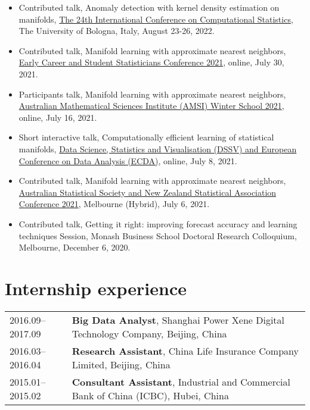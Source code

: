 \documentclass[10pt,a4paper,]{article}
\begin{document}
\begin{itemize}
\item
  Contributed talk, Anomaly detection with kernel density estimation on
  manifolds,
  \href{http://www.compstat2022.org/index.php}{The 24th International Conference on Computational Statistics},
  The University of Bologna, Italy, August 23-26, 2022.
\item
  Contributed talk, Manifold learning with approximate nearest
  neighbors,
  \href{http://ecssc2021.com.au/}{Early Career and Student Statisticians Conference 2021},
  online, July 30, 2021.
\item
  Participants talk, Manifold learning with approximate nearest
  neighbors,
  \href{https://ws.amsi.org.au/}{Australian Mathematical Sciences Institute (AMSI) Winter School 2021},
  online, July 16, 2021.
\item
  Short interactive talk, Computationally efficient learning of
  statistical manifolds,
  \href{https://iasc-isi.org/dssv-ecda2021/}{Data Science, Statistics and Visualisation (DSSV) and European Conference on Data Analysis (ECDA)},
  online, July 8, 2021.
\item
  Contributed talk, Manifold learning with approximate nearest
  neighbors,
  \href{https://anzsc2021.com.au/}{Australian Statistical Society and New Zealand Statistical Association Conference 2021},
  Melbourne (Hybrid), July 6, 2021.
\item
  Contributed talk, Getting it right: improving forecast accuracy and
  learning techniques Session, Monash Business School Doctoral Research
  Colloquium, Melbourne, December 6, 2020.
\end{itemize}

\hypertarget{internship-experience}{%
\section{Internship experience}\label{internship-experience}}

\begin{tabular}{ll}
  2016.09--2017.09 & \textbf{Big Data Analyst}, Shanghai Power Xene Digital Technology Company, Beijing, China \\ 
  2016.03--2016.04 & \textbf{Research Assistant}, China Life Insurance Company Limited, Beijing, China \\ 
  2015.01--2015.02 & \textbf{Consultant Assistant}, Industrial and Commercial Bank of China (ICBC), Hubei, China \\ 
  \end{tabular}
\end{document}
